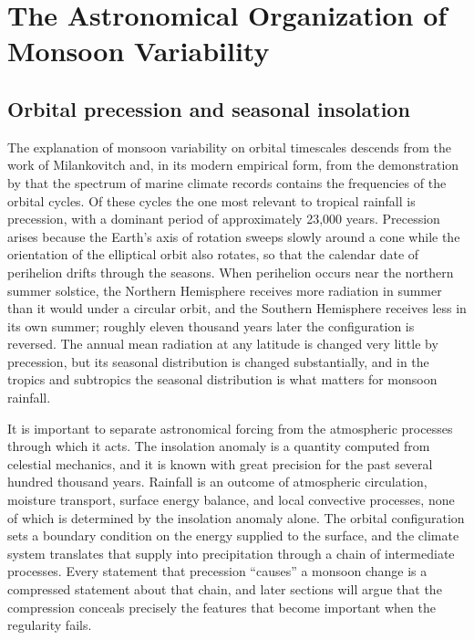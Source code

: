 \documentclass[11pt]{article}
\theoremstyle{definition}
\begin{document}
\section{The Astronomical Organization of Monsoon Variability}

\subsection{Orbital precession and seasonal insolation}

The explanation of monsoon variability on orbital timescales descends from the work of Milankovitch and, in its modern empirical form, from the demonstration by \citet{hays1976} that the spectrum of marine climate records contains the frequencies of the orbital cycles. Of these cycles the one most relevant to tropical rainfall is precession, with a dominant period of approximately 23,000 years. Precession arises because the Earth's axis of rotation sweeps slowly around a cone while the orientation of the elliptical orbit also rotates, so that the calendar date of perihelion drifts through the seasons. When perihelion occurs near the northern summer solstice, the Northern Hemisphere receives more radiation in summer than it would under a circular orbit, and the Southern Hemisphere receives less in its own summer; roughly eleven thousand years later the configuration is reversed. The annual mean radiation at any latitude is changed very little by precession, but its seasonal distribution is changed substantially, and in the tropics and subtropics the seasonal distribution is what matters for monsoon rainfall.

It is important to separate astronomical forcing from the atmospheric processes through which it acts. The insolation anomaly is a quantity computed from celestial mechanics, and it is known with great precision for the past several hundred thousand years. Rainfall is an outcome of atmospheric circulation, moisture transport, surface energy balance, and local convective processes, none of which is determined by the insolation anomaly alone. The orbital configuration sets a boundary condition on the energy supplied to the surface, and the climate system translates that supply into precipitation through a chain of intermediate processes. Every statement that precession ``causes'' a monsoon change is a compressed statement about that chain, and later sections will argue that the compression conceals precisely the features that become important when the regularity fails.
\end{document}
